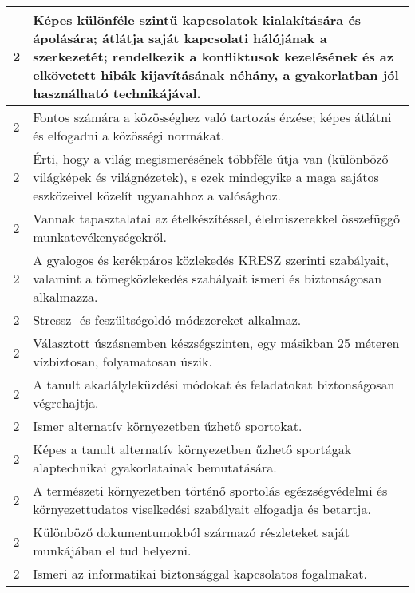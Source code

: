 \begin{longtable}{c | p{12cm} }
                                
                                          2 &  Képes különféle szintű kapcsolatok kialakítására és ápolására; átlátja saját kapcsolati hálójának a szerkezetét; rendelkezik a konfliktusok kezelésének és az elkövetett hibák kijavításának néhány, a gyakorlatban jól használható technikájával. \\ \hline
                                          2 &  Fontos számára a közösséghez való tartozás érzése; képes átlátni és elfogadni a közösségi normákat. \\ \hline
                                          2 &  Érti, hogy a világ megismerésének többféle útja van (különböző világképek és világnézetek), s ezek mindegyike a maga sajátos eszközeivel közelít ugyanahhoz a valósághoz. \\ \hline
                                          2 &  Vannak tapasztalatai az ételkészítéssel, élelmiszerekkel összefüggő munkatevékenységekről. \\ \hline
                                          2 &  A gyalogos és kerékpáros közlekedés KRESZ szerinti szabályait, valamint a tömegközlekedés szabályait ismeri és biztonságosan alkalmazza. \\ \hline
                                          2 &  Stressz- és feszültségoldó módszereket alkalmaz. \\ \hline
                                          2 &  Választott úszásnemben készségszinten, egy másikban 25 méteren vízbiztosan, folyamatosan úszik. \\ \hline
                                          2 &  A tanult akadályleküzdési módokat és feladatokat biztonságosan végrehajtja. \\ \hline
                                          2 &  Ismer alternatív környezetben űzhető sportokat. \\ \hline
                                          2 &  Képes a tanult alternatív környezetben űzhető sportágak alaptechnikai gyakorlatainak bemutatására. \\ \hline
                                          2 &  A természeti környezetben történő sportolás egészségvédelmi és környezettudatos viselkedési szabályait elfogadja és betartja. \\ \hline
                                          2 &  Különböző dokumentumokból származó részleteket saját munkájában el tud helyezni. \\ \hline
                                          2 &  Ismeri az informatikai biztonsággal kapcsolatos fogalmakat. \\ \hline

\end{longtable}
